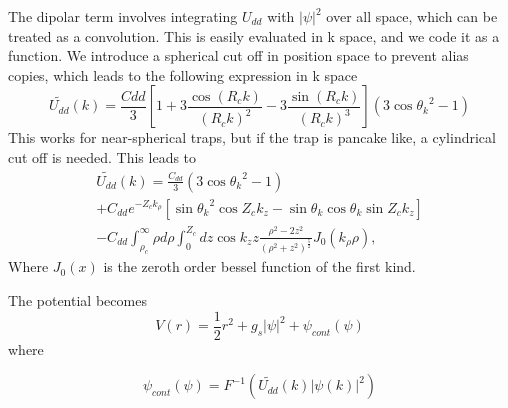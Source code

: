 \documentclass[10pt]{article}
\begin{document}
\begin{multicols}{2}
The dipolar term involves integrating $U_{dd}$ with $|\psi|^{2}$ over all space, which can be treated as a convolution. This is easily evaluated in k space, and we code it as a function. We introduce a spherical cut off in position space to prevent alias copies, which leads to the following expression in k space 
\begin{equation}
\tilde{U_{dd}}(k) = \frac{Cdd}{3}[1+3\frac{\cos(R_{c}k)}{(R_{c}k)^{2}}-3\frac{\sin(R_{c}k)}{(R_{c}k)^{3}}](3\cos{\theta_{k}}^{2}-1)
\end{equation} 
This works for near-spherical traps, but if the trap is pancake like, a cylindrical cut off is needed. This leads to
\begin{multline}
\tilde{U_{dd}}(k) = \frac{C_{dd}}{3}(3\cos{\theta_k}^{2}-1) \\+ C_{dd}e^{-Z_{c}k_{\rho}}[\sin{\theta_{k}}^{2}\cos{Z_{c}k_{z}} -\sin{\theta_{k}}\cos{\theta_{k}}\sin{Z_{c}k_{z}}] \\- C_{dd}\int_{\rho_{c}}^{\infty}\rho d\rho\int_{0}^{Z_{c}}dz\cos{k_{z}z}\frac{\rho^{2}-2z^{2}}{(\rho^{2}+z^{2})^{\frac{5}{2}}}J_{0}(k_{\rho}\rho),
\end{multline} 
Where $J_{0}(x)$ is the zeroth order bessel function of the first kind.

The potential becomes
\begin{equation}
V(r) = \frac{1}{2}r^{2}+g_{s}|\psi|^{2}+\psi_{cont}(\psi)
\end{equation}
where 

\begin{equation}
\psi_{cont}(\psi) = F^{-1}(\tilde{U_{dd}}(k)|\psi(k)|^{2})
\end{equation}

\end{multicols}
\end{document}
